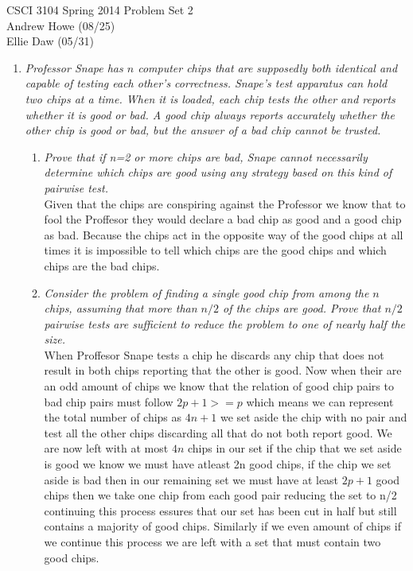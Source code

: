\documentclass[12pt]{article}
\begin{document}
CSCI 3104 Spring 2014 \hfill Problem Set 2\\
Andrew Howe (08/25) \\
Ellie Daw (05/31)\\
\hrulefill

\begin{enumerate}

	\item	\textit{Professor Snape has $n$ computer chips that are supposedly both identical
and capable of testing each other's correctness. Snape's test apparatus can hold two
chips at a time. When it is loaded, each chip tests the other and reports whether it is
good or bad. A good chip always reports accurately whether the other chip is good or
bad, but the answer of a bad chip cannot be trusted.}
	

	\begin{enumerate}
	\item \textit{Prove that if n=2 or more chips are bad, Snape cannot necessarily determine which chips are good using any strategy based on this kind of pairwise test.}\\
	
	
	Given that the chips are conspiring against the Professor we know that to fool the Proffesor they would declare a bad chip as good and a good chip as bad. Because the chips act in the opposite way of the good chips at all times it is impossible to tell which chips are the good chips and which chips are the bad chips.\\
	
	\item \textit{Consider the problem of finding a single good chip from among the $n$ chips, assuming that more than $n/2$ of the chips are good. Prove that $n/2$ pairwise tests are sufficient to reduce the problem to one of nearly half the size.}\\
	
	When Proffesor Snape tests a chip he discards any chip that does not result in both chips reporting that the other is good. Now when their are an odd amount of chips we know that the relation of good chip pairs to bad chip pairs must follow $2p+1>=p$ which means we can represent the total number of chips as $4n+1$ 
	we set aside the chip with no pair and test all the other chips discarding all that do not both report good. We are now left with at most $4n$ chips in our set if the chip that we set aside is good we know we must have atleast 2n good chips, if the chip we set aside is bad then in our remaining set we must have at least $2p+1$ good chips then we take one chip from each good pair reducing the set to n/2 continuing this process essures that our set has been cut in half but still contains a majority of good chips. 
	Similarly if we even amount of chips if we continue this process we are left with a set that must contain two good chips.\\
	

\end{enumerate}
\end{enumerate}
\end{document}
